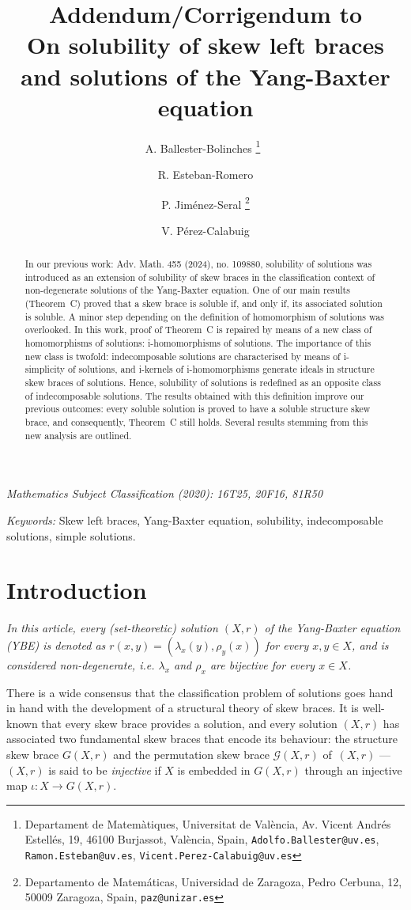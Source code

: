 \documentclass[12pt, a4paper, english]{article}
\title{Addendum/Corrigendum to\\
{\Large On solubility of skew left braces and solutions of the Yang-Baxter equation}}
\author{A. Ballester-Bolinches \thanks{Departament de Matem\`atiques, Universitat de Val\`encia, Av. Vicent Andrés Estellés, 19, 46100 Burjassot, Val\`encia, Spain, \texttt{Adolfo.Ballester@uv.es}, \texttt{Ramon.Esteban@uv.es}, \texttt{Vicent.Perez-Calabuig@uv.es}}\  \and R. Esteban-Romero\addtocounter{footnote}{-1}\footnotemark \and P. Jim\'enez-Seral \thanks{Departamento de Matem\'aticas, Universidad de Zaragoza, Pedro Cerbuna, 12, 50009 Zaragoza, Spain, \texttt{paz@unizar.es}}\and V. P\'erez-Calabuig\addtocounter{footnote}{-2}\footnotemark}
\date{}
\theoremstyle{definition}
\theoremstyle{remark}
\begin{document}
\maketitle

\begin{abstract}
In our previous work: Adv. Math. 455 (2024), no. 109880, solubility of solutions was introduced as an extension of solubility of skew braces in the classification context of non-degenerate solutions of the Yang-Baxter equation. One of our main results (Theorem~C) proved that a skew brace is soluble if, and only if, its associated solution is soluble. A minor step depending on the definition of homomorphism of solutions was overlooked. In this work, proof of Theorem~C is repaired by means of a new class of homomorphisms of solutions: i-homomorphisms of solutions. The importance of this new class is twofold: indecomposable solutions are characterised by means of i-simplicity of solutions, and i-kernels of i-homomorphisms generate ideals in structure skew braces of solutions. Hence, solubility of solutions is redefined as an opposite class of indecomposable solutions. The results obtained with this definition improve our previous outcomes: every soluble solution is proved to have a soluble structure skew brace, and consequently, Theorem~C still holds. Several results stemming from this new analysis are outlined.
\end{abstract}

\emph{Mathematics Subject Classification (2020):  16T25, 20F16, 81R50}  

\emph{Keywords:} Skew left braces, Yang-Baxter equation, solubility, indecomposable solutions, simple solutions.

\section{Introduction}
\emph{In this article, every (set-theoretic) solution $(X,r)$ of the Yang-Baxter equation (YBE) is denoted as $r(x,y) = (\lambda_x(y), \rho_y(x))$ for every $x,y\in X$, and is considered non-degenerate, i.e. $\lambda_x$ and $\rho_x$ are bijective for every $x\in X$.}

There is a wide consensus that the classification problem of solutions goes hand in hand with the development of a structural theory of skew braces. It is well-known that every skew brace provides a solution, and every solution $(X,r)$ has associated two fundamental skew braces that encode its behaviour: the structure skew brace $G(X,r)$ and the permutation skew brace $\mathcal{G}(X,r)$ of~$(X,r)$ ---$(X,r)$ is said to be \emph{injective} if $X$ is embedded in $G(X,r)$ through an injective map $\iota \colon X \rightarrow G(X,r)$. 
\end{document}
